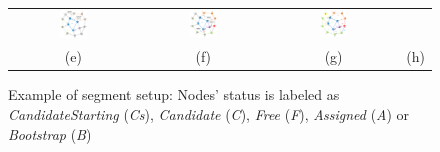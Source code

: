 \begin{figure}
\begin{tabular}{cccc}
\includegraphics[width=0.23\textwidth]{pictures/seq06.eps} &
\includegraphics[width=0.23\textwidth]{pictures/seq07.eps} & 
\includegraphics[width=0.23\textwidth]{pictures/seq08.eps} \\
(e) & (f) & (g) & (h) \\
\end{tabular}
\caption{Example of \disr{} segment setup: Nodes' status is labeled as \emph{CandidateStarting} (\emph{Cs}), \emph{Candidate} (\emph{C}), \emph{Free} (\emph{F}), \emph{Assigned} (\emph{A}) or \emph{Bootstrap} (\emph{B})}
\label{fig:disr_events}
\end{figure}

